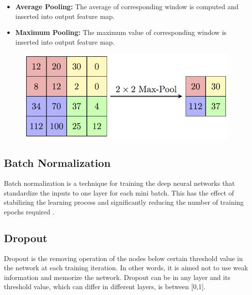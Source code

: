 \begin{itemize}
	\item \textbf{Average Pooling:}  The average of corresponding window is computed and inserted into output feature map.
	\item \textbf{Maximum Pooling:}  The maximum value of corresponding window is inserted into output feature map.
\end{itemize}

\begin{figure}[h]
	\centering
	\includegraphics[width=.8\linewidth]{fig/MaxpoolSample.png}
	\label{fig:maxpooling}
\end{figure}

\subsection{Batch Normalization}

Batch normalization is a technique for training the deep neural networks that standardize the inputs to one layer for each mini batch. This has the effect of stabilizing the learning process and significantly reducing the number of training epochs required \cite{A_novelCNNModel}.

\subsection{Dropout}

Dropout is the removing operation of the nodes below certain threshold value in the network at each training iteration. In other words, it is aimed not to use weak information and memorize the network. Dropout can be in any layer and its threshold value, which can differ in different layers,  is between [0,1].

